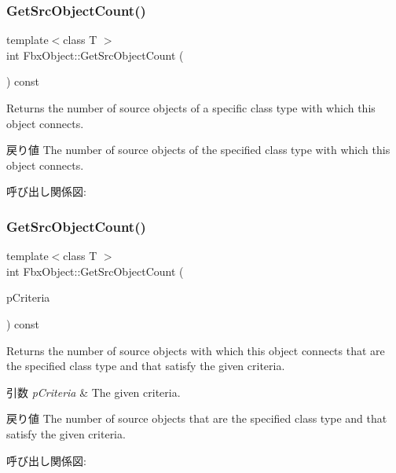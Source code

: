 \subsubsection{\texorpdfstring{Get\+Src\+Object\+Count()}{GetSrcObjectCount()}\hspace{0.1cm}{\footnotesize\ttfamily [3/4]}}
{\footnotesize\ttfamily template$<$class T $>$ \\
int Fbx\+Object\+::\+Get\+Src\+Object\+Count (\begin{DoxyParamCaption}{ }\end{DoxyParamCaption}) const}

Returns the number of source objects of a specific class type with which this object connects. \begin{DoxyReturn}{戻り値}
The number of source objects of the specified class type with which this object connects. 
\end{DoxyReturn}
呼び出し関係図\+:
\mbox{\label{class_fbx_object_aabefdc2922a216fb7a1ce864fcf2438a}} 
\subsubsection{\texorpdfstring{Get\+Src\+Object\+Count()}{GetSrcObjectCount()}\hspace{0.1cm}{\footnotesize\ttfamily [4/4]}}
{\footnotesize\ttfamily template$<$class T $>$ \\
int Fbx\+Object\+::\+Get\+Src\+Object\+Count (\begin{DoxyParamCaption}\item[{const \hyperlink{class_fbx_criteria}{Fbx\+Criteria} \&}]{p\+Criteria }\end{DoxyParamCaption}) const}

Returns the number of source objects with which this object connects that are the specified class type and that satisfy the given criteria. 
\begin{DoxyParams}{引数}
{\em p\+Criteria} & The given criteria. \\
\hline
\end{DoxyParams}
\begin{DoxyReturn}{戻り値}
The number of source objects that are the specified class type and that satisfy the given criteria. 
\end{DoxyReturn}
呼び出し関係図\+:
\mbox{\label{class_fbx_object_aa79380869a619b260fd1f861eb224f5e}} 
